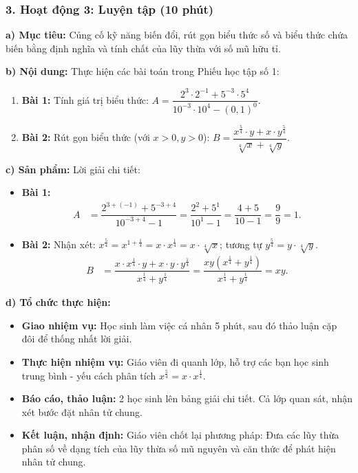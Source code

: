 \documentclass[12pt, a4paper]{article}
\begin{document}
\subsubsection*{3. Hoạt động 3: Luyện tập (10 phút)}

\noindent \textbf{a) Mục tiêu:}
Củng cố kỹ năng biến đổi, rút gọn biểu thức số và biểu thức chứa biến bằng định nghĩa và tính chất của lũy thừa với số mũ hữu tỉ.

\noindent \textbf{b) Nội dung:}
Thực hiện các bài toán trong Phiếu học tập số 1:
\begin{enumerate}[leftmargin=0.6cm]
    \item \textbf{Bài 1:} Tính giá trị biểu thức: $A = \dfrac{2^3 \cdot 2^{-1} + 5^{-3} \cdot 5^4}{10^{-3} \cdot 10^4 - (0{,}1)^0}$.
    \item \textbf{Bài 2:} Rút gọn biểu thức (với $x > 0, y > 0$): $B = \dfrac{x^{\frac{5}{4}} \cdot y + x \cdot y^{\frac{5}{4}}}{\sqrt[4]{x} + \sqrt[4]{y}}$.
\end{enumerate}

\noindent \textbf{c) Sản phẩm:}
Lời giải chi tiết:
\begin{itemize}
    \item \textbf{Bài 1:}
    \begin{align*}
        A &= \dfrac{2^{3 + (-1)} + 5^{-3 + 4}}{10^{-3 + 4} - 1} = \dfrac{2^2 + 5^1}{10^1 - 1} = \dfrac{4 + 5}{10 - 1} = \dfrac{9}{9} = 1.
    \end{align*}
    \item \textbf{Bài 2:}
    Nhận xét: $x^{\frac{5}{4}} = x^{1 + \frac{1}{4}} = x \cdot x^{\frac{1}{4}} = x \cdot \sqrt[4]{x}$; tương tự $y^{\frac{5}{4}} = y \cdot \sqrt[4]{y}$.
    \begin{align*}
        B &= \dfrac{x \cdot x^{\frac{1}{4}} \cdot y + x \cdot y \cdot y^{\frac{1}{4}}}{x^{\frac{1}{4}} + y^{\frac{1}{4}}} = \dfrac{xy\left(x^{\frac{1}{4}} + y^{\frac{1}{4}}\right)}{x^{\frac{1}{4}} + y^{\frac{1}{4}}} = xy.
    \end{align*}
\end{itemize}

\noindent \textbf{d) Tổ chức thực hiện:}
\begin{itemize}[leftmargin=0.6cm]
    \item \textbf{Giao nhiệm vụ:} Học sinh làm việc cá nhân 5 phút, sau đó thảo luận cặp đôi để thống nhất lời giải.
    \item \textbf{Thực hiện nhiệm vụ:} Giáo viên đi quanh lớp, hỗ trợ các bạn học sinh trung bình - yếu cách phân tích $x^{\frac{5}{4}} = x \cdot x^{\frac{1}{4}}$.
    \item \textbf{Báo cáo, thảo luận:} 2 học sinh lên bảng giải chi tiết. Cả lớp quan sát, nhận xét bước đặt nhân tử chung.
    \item \textbf{Kết luận, nhận định:} Giáo viên chốt lại phương pháp: Đưa các lũy thừa phân số về dạng tích của lũy thừa số mũ nguyên và căn thức để phát hiện nhân tử chung.
\end{itemize}
\end{document}
